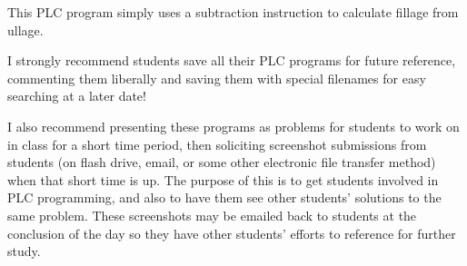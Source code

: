 












This PLC program simply uses a subtraction instruction to calculate fillage from ullage.

\vskip 10pt

I strongly recommend students save all their PLC programs for future reference, commenting them liberally and saving them with special filenames for easy searching at a later date!

\vskip 10pt

I also recommend presenting these programs as problems for students to work on in class for a short time period, then soliciting screenshot submissions from students (on flash drive, email, or some other electronic file transfer method) when that short time is up.  The purpose of this is to get students involved in PLC programming, and also to have them see other students' solutions to the same problem.  These screenshots may be emailed back to students at the conclusion of the day so they have other students' efforts to reference for further study.




